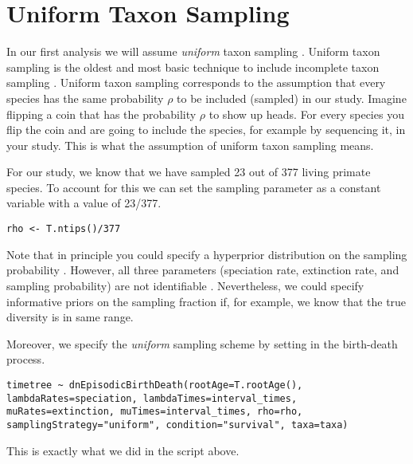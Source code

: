 \section{Uniform Taxon Sampling}

In our first analysis we will assume \emph{uniform} taxon sampling \citep[see][]{Hoehna2011,Hoehna2014a}.
Uniform taxon sampling is the oldest and most basic technique to include incomplete taxon sampling \citep{Nee1994b,Yang1997}.
Uniform taxon sampling corresponds to the assumption that every species has the same probability $\rho$ to be included (\IE sampled) in our study.
Imagine flipping a coin that has the probability $\rho$ to show up heads.
For every species you flip the coin and are going to include the species, for example by sequencing it, in your study.
This is what the assumption of uniform taxon sampling means.

For our study, we know that we have sampled 23 out of 377 living primate species. 
To account for this we can set the sampling parameter as a constant variable with a value of 23/377.
{\tt \begin{snugshade*}
\begin{lstlisting}
rho <- T.ntips()/377
\end{lstlisting}
\end{snugshade*}}
Note that in principle you could specify a hyperprior distribution on the sampling probability .
However, all three parameters (speciation rate, extinction rate, and sampling probability) are not identifiable \citep{Stadler2009}.
Nevertheless, we could specify informative priors on the sampling fraction if, for example, we know that the true diversity is in same range. 

Moreover, we specify the \emph{uniform} sampling scheme by setting  in the birth-death process.
{\tt \begin{snugshade*}
\begin{lstlisting}
timetree ~ dnEpisodicBirthDeath(rootAge=T.rootAge(), lambdaRates=speciation, lambdaTimes=interval_times, muRates=extinction, muTimes=interval_times, rho=rho, samplingStrategy="uniform", condition="survival", taxa=taxa)
\end{lstlisting}
\end{snugshade*}}
This is exactly what we did in the \Rev script above.



